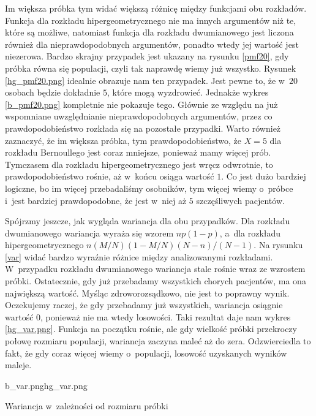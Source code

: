 Im większa próbka tym widać większą różnicę między funkcjami obu rozkładów. Funkcja dla rozkładu hipergeometrycznego nie ma innych argumentów niż te, które są możliwe, natomiast funkcja dla rozkładu dwumianowego jest liczona również dla nieprawdopodobnych argumentów, ponadto wtedy jej wartość jest niezerowa. Bardzo skrajny przypadek jest ukazany na rysunku \ref{pmf20}, gdy próbka równa się populacji, czyli tak naprawdę wiemy już wszystko. Rysunek \ref{hg_pmf20.png} idealnie obrazuje nam ten przypadek. Jest pewne to, że w~$20$ osobach będzie dokładnie $5$, które mogą wyzdrowieć. Jednakże wykres \ref{b_pmf20.png} kompletnie nie pokazuje tego. Głównie ze względu na już wspomniane uwzględnianie nieprawdopodobnych argumentów, przez co prawdopodobieństwo rozkłada się na pozostałe przypadki. Warto również zaznaczyć, że im większa próbka, tym prawdopodobieństwo, że $X=5$ dla rozkładu Bernoullego jest coraz mniejsze, ponieważ mamy więcej prób. Tymczasem dla rozkładu hipergeometrycznego jest wręcz odwrotnie, to prawdopodobieństwo rośnie, aż w~końcu osiąga wartość $1$. Co jest dużo bardziej logiczne, bo im więcej przebadaliśmy osobników, tym więcej wiemy o~próbce i~jest bardziej prawdopodobne, że jest w~niej aż $5$ szczęśliwych pacjentów.

Spójrzmy jeszcze, jak wygląda wariancja dla obu przypadków. Dla rozkładu dwumianowego wariancja wyraża się wzorem $np(1-p)$, a~dla rozkładu hipergeometrycznego $n(M/N)(1-M/N)(N-n)/(N-1)$. Na rysunku \ref{var} widać bardzo wyraźnie różnice między analizowanymi rozkładami. W~przypadku rozkładu dwumianowego wariancja stale rośnie wraz ze wzrostem próbki. Ostatecznie, gdy już przebadamy wszystkich chorych pacjentów, ma ona największą wartość. Myśląc zdroworozsądkowo, nie jest to poprawny wynik. Oczekujemy raczej, że gdy przebadamy już wszystkich, wariancja osiągnie wartość $0$, ponieważ nie ma wtedy losowości. Taki rezultat daje nam wykres \ref{hg_var.png}. Funkcja na początku rośnie, ale gdy wielkość próbki przekroczy połowę rozmiaru populacji, wariancja zaczyna maleć aż do zera. Odzwierciedla to fakt, że gdy coraz więcej wiemy o~populacji, losowość uzyskanych wyników maleje.

\begin{diagrams}{b_var.png}{hg_var.png}
	\caption{Wariancja w~zależności od rozmiaru próbki}
	\label{var}
\end{diagrams}